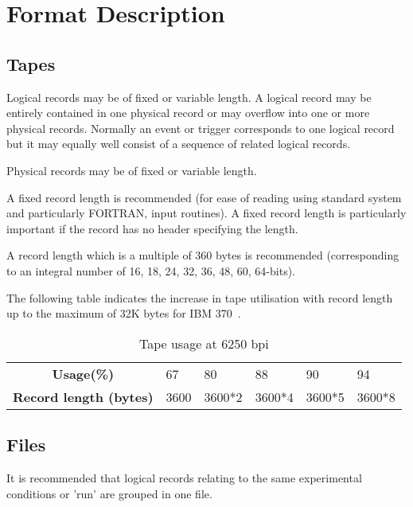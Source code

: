 \newpage

\section{Format Description}
\label{sec:EPIOformat}

\subsection{Tapes}
 
Logical records may be of fixed or variable length.
A logical record may be entirely contained in one physical record
or may overflow into one or more physical records.  Normally an
event or trigger corresponds to one logical record but it may equally
well consist of a sequence of related logical records.
 
Physical records may be of fixed or variable length.
 
A fixed record length is recommended (for ease of reading using standard
system and particularly FORTRAN, input routines). A fixed record length
is particularly important if the record has no header specifying the
length.
 
A record length which is a multiple of 360 bytes is recommended
(corresponding to an integral number of 16, 18, 24, 32, 36, 48, 60, 64-bits).
 
The following table indicates the increase in tape utilisation with record
length up to the maximum of 32K bytes for IBM 370~\cite{bib-WYLBUR}.
\begin{table}[h]
\centering
\begin{tabular}{clllll}
\textbf{Usage(\%)}            &
67   & 80     & 88     & 90     & 94      \\
\textbf{Record length (bytes)}&
3600 & 3600*2 & 3600*4 & 3600*5 & 3600*8  \\
\end{tabular}
\caption{Tape usage at 6250 bpi}
\label{tab:tapeusage}
\end{table}
 
\subsection{Files}
 
It is recommended that logical records relating to the same
experimental conditions or 'run' are grouped in one file.
 
